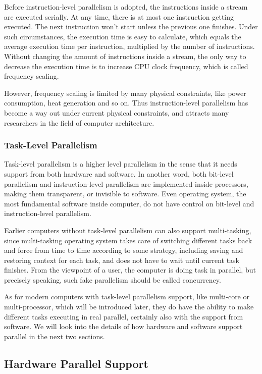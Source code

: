 \documentclass[12pt,a4paper]{report}
\begin{document}
Before instruction-level parallelism is adopted, the instructions inside a stream are executed serially. At any time, there is at most one instruction getting executed. The next instruction won't start unless the previous one finishes. Under such circumstances, the execution time is easy to calculate, which equals the average execution time per instruction, multiplied by the number of instructions. Without changing the amount of instructions inside a stream, the only way to decrease the execution time is to increase CPU clock frequency, which is called frequency scaling.

However, frequency scaling is limited by many physical constraints, like power consumption, heat generation and so on. Thus instruction-level parallelism has become a way out under current physical constraints, and attracts many researchers in the field of computer architecture.

\subsubsection{Task-Level Parallelism}
\label{sec:pseudo-multi-tasking}

Task-level parallelism is a higher level parallelism in the sense that it needs support from both hardware and software. In another word, both bit-level parallelism and instruction-level parallelism are implemented inside processors, making them transparent, or invisible to software. Even operating system, the most fundamental software inside computer, do not have control on bit-level and instruction-level parallelism. 

Earlier computers without task-level parallelism can also support multi-tasking, since multi-tasking operating system takes care of switching different tasks back and force from time to time according to some strategy, including saving and restoring context for each task, and does not have to wait until current task finishes. From the viewpoint of a user, the computer is doing task in parallel, but precisely speaking, such fake parallelism should be called concurrency. 

As for modern computers with task-level parallelism support, like multi-core or multi-processor, which will be introduced later, they do have the ability to make different tasks executing in real parallel, certainly also with the support from software. We will look into the details of how hardware and software support parallel in the next two sections.

\subsection{Hardware Parallel Support}
\end{document}
